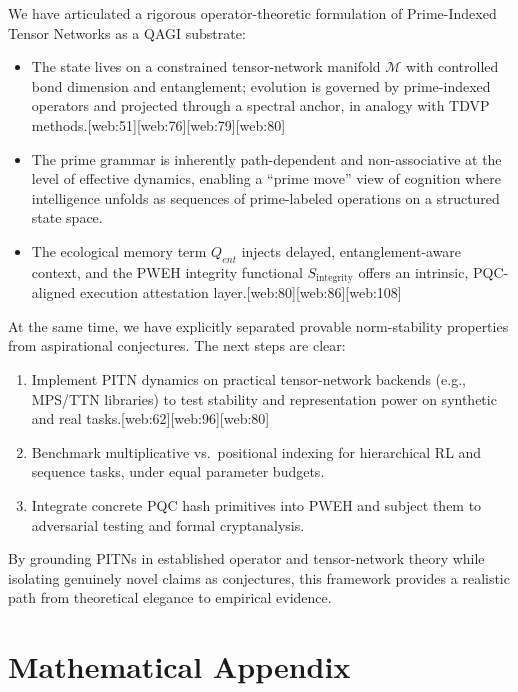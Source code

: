 \documentclass[11pt]{article}
\begin{document}
We have articulated a rigorous operator-theoretic formulation of Prime-Indexed Tensor Networks as a QAGI substrate:
\begin{itemize}[leftmargin=*]
  \item The state lives on a constrained tensor-network manifold \( \mathcal{M} \) with controlled bond dimension and entanglement; evolution is governed by prime-indexed operators and projected through a spectral anchor, in analogy with TDVP methods.[web:51][web:76][web:79][web:80]
  \item The prime grammar is inherently path-dependent and non-associative at the level of effective dynamics, enabling a ``prime move'' view of cognition where intelligence unfolds as sequences of prime-labeled operations on a structured state space.
  \item The ecological memory term \( Q_{ent} \) injects delayed, entanglement-aware context, and the PWEH integrity functional \( S_{\text{integrity}} \) offers an intrinsic, PQC-aligned execution attestation layer.[web:80][web:86][web:108]
\end{itemize}

At the same time, we have explicitly separated provable norm-stability properties from aspirational conjectures. The next steps are clear:
\begin{enumerate}[leftmargin=*]
  \item Implement PITN dynamics on practical tensor-network backends (e.g., MPS/TTN libraries) to test stability and representation power on synthetic and real tasks.[web:62][web:96][web:80]
  \item Benchmark multiplicative vs.\ positional indexing for hierarchical RL and sequence tasks, under equal parameter budgets.
  \item Integrate concrete PQC hash primitives into PWEH and subject them to adversarial testing and formal cryptanalysis.
\end{enumerate}

By grounding PITNs in established operator and tensor-network theory while isolating genuinely novel claims as conjectures, this framework provides a realistic path from theoretical elegance to empirical evidence.

\appendix
\section*{Mathematical Appendix}
\end{document}
